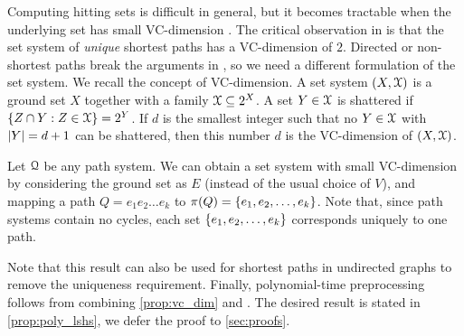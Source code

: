 Computing hitting sets is difficult in general, but it becomes tractable when the underlying set has small VC-dimension \citep{vc_dim_hitting}.
The critical observation in \citep{highway2013} is that the set system of \emph{unique} shortest paths has a VC-dimension of $2$.
Directed or non-shortest paths break the arguments in \citep{highway2013}, so we need a different formulation of the set system.
We recall the concept of VC-dimension.
A set system $(X,\mathcal{X})$ is a ground set $X$ together with a family $\mathcal{X}\subseteq 2^X$.
A set $Y\in \mathcal{X}$ is shattered if $\{Z\cap Y:Z\in\mathcal{X}\}=2^Y$.
If $d$ is the smallest integer such that no $Y\in\mathcal{X}$ with $\lvert Y\rvert=d+1$ can be shattered, then this number $d$ is the VC-dimension of $(X,\mathcal{X})$.

Let $\mathcal{Q}$ be any path system.
We can obtain a set system with small VC-dimension by considering the ground set as $E$ (instead of the usual choice of $V$), and mapping a path $Q=e_1e_2\ldots e_k$ to $\pi(Q)=\{e_1,e_2,\ldots,e_k\}$.
Note that, since path systems contain no cycles, each set $\{e_1,e_2,\ldots,e_k\}$ corresponds uniquely to one path.
Note that this result can also be used for shortest paths in undirected graphs to remove the uniqueness requirement.
Finally, polynomial-time preprocessing follows from combining \cref{prop:vc_dim} and \citep{vc_dim_hitting}.
The desired result is stated in \cref{prop:poly_lshs}, we defer the proof to \cref{sec:proofs}.

